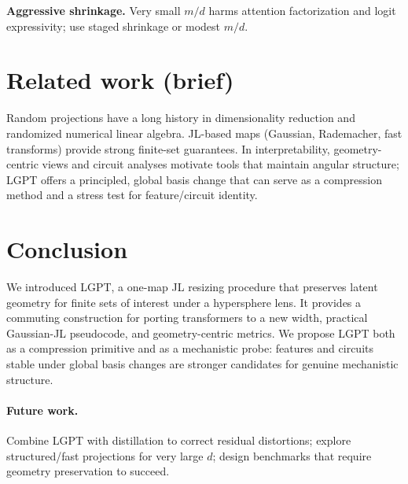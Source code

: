 \documentclass{article}
\begin{document}
\noindent\textbf{Aggressive shrinkage.} Very small $m/d$ harms attention factorization
and logit expressivity; use staged shrinkage or modest $m/d$.

\section{Related work (brief)}
Random projections have a long history in dimensionality reduction and randomized
numerical linear algebra. JL-based maps (Gaussian, Rademacher, fast transforms)
provide strong finite-set guarantees. In interpretability, geometry-centric views
and circuit analyses motivate tools that maintain angular structure; LGPT offers
a principled, global basis change that can serve as a compression method and a
stress test for feature/circuit identity.

\section{Conclusion}
We introduced LGPT, a one-map JL resizing procedure that preserves latent geometry
for finite sets of interest under a hypersphere lens. It provides a commuting
construction for porting transformers to a new width, practical Gaussian-JL
pseudocode, and geometry-centric metrics. We propose LGPT both as a compression
primitive and as a mechanistic probe: features and circuits stable under global
basis changes are stronger candidates for genuine mechanistic structure.

\paragraph{Future work.} Combine LGPT with distillation to correct residual
distortions; explore structured/fast projections for very large $d$; design
benchmarks that require geometry preservation to succeed.
\end{document}
